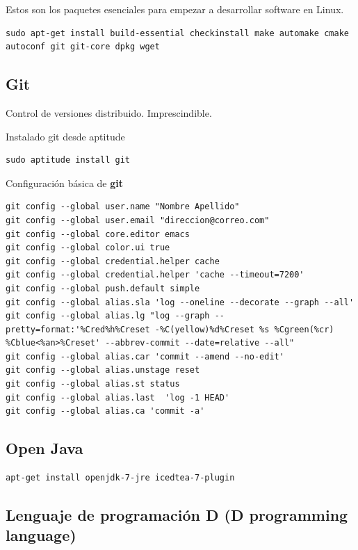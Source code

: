 \documentclass[12pt,spanish,]{scrartcl}
\begin{document}
Estos son los paquetes esenciales para empezar a desarrollar software en
Linux.

\begin{verbatim}
sudo apt-get install build-essential checkinstall make automake cmake autoconf git git-core dpkg wget
\end{verbatim}

\hypertarget{git}{%
\subsection{Git}\label{git}}

Control de versiones distribuido. Imprescindible.

Instalado git desde aptitude

\begin{verbatim}
sudo aptitude install git
\end{verbatim}

Configuración básica de \textbf{git}

\begin{verbatim}
git config --global user.name "Nombre Apellido"
git config --global user.email "direccion@correo.com"
git config --global core.editor emacs
git config --global color.ui true
git config --global credential.helper cache
git config --global credential.helper 'cache --timeout=7200'
git config --global push.default simple
git config --global alias.sla 'log --oneline --decorate --graph --all'
git config --global alias.lg "log --graph --pretty=format:'%Cred%h%Creset -%C(yellow)%d%Creset %s %Cgreen(%cr) %Cblue<%an>%Creset' --abbrev-commit --date=relative --all"
git config --global alias.car 'commit --amend --no-edit'
git config --global alias.unstage reset
git config --global alias.st status
git config --global alias.last  'log -1 HEAD'
git config --global alias.ca 'commit -a'
\end{verbatim}

\hypertarget{open-java}{%
\subsection{Open Java}\label{open-java}}

\begin{verbatim}
apt-get install openjdk-7-jre icedtea-7-plugin
\end{verbatim}

\hypertarget{lenguaje-de-programaciuxf3n-d-d-programming-language}{%
\subsection{Lenguaje de programación D (D programming
language)}\label{lenguaje-de-programaciuxf3n-d-d-programming-language}}
\end{document}
